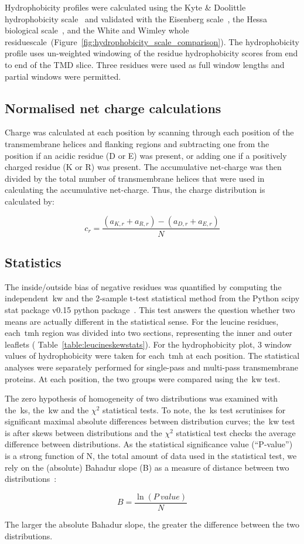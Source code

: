 Hydrophobicity profiles were calculated using the Kyte \& Doolittle hydrophobicity scale~\cite{Kyte1982} and validated with the Eisenberg scale~\cite{Eisenberg1984}, the Hessa biological scale~\cite{Hessa2005}, and the White and Wimley whole residuescale~\cite{White1999}(Figure~\ref{fig:hydrophobicity_scale_comparison}).
The hydrophobicity profile uses un-weighted windowing of the residue hydrophobicity scores from end to end of the TMD slice.
Three residues were used as full window lengths and partial windows were permitted.

\subsection{Normalised net charge calculations}

Charge was calculated at each position by scanning through each position of the transmembrane helices and flanking regions and subtracting one from the position if an acidic residue (D or E) was present, or adding one if a positively charged residue (K or R) was present.
The accumulative net-charge  was then divided by the total number  of transmembrane helices that were used in calculating the accumulative net-charge.
Thus, the charge distribution is calculated by:

\begin{equation} \label{eq:charge_equation}
c_r=\frac{(a_{K,r}+a_{R,r})-(a_{D,r}+a_{E,r})}{N}
\end{equation}

\subsection{Statistics}

The inside/outside bias of negative residues was quantified by computing the independent~\gls{kw} and the 2-sample t-test statistical method from the Python scipy stat package v0.15 python package~\cite{VanderWalt2011}.
This test answers the question whether two means are actually different in the statistical sense.
For the leucine residues, each~\gls{tmh} region was divided into two sections, representing the inner and outer leaflets ( Table~\ref{table:leucineskewstats}).
 For the hydrophobicity plot, 3 window values of hydrophobicity were taken for each~\gls{tmh} at each position.
The statistical analyses were separately performed for single-pass and multi-pass transmembrane proteins.
At each position, the two groups were compared using the~\gls{kw} test.

The zero hypothesis of homogeneity of two distributions was examined with the~\gls{ks}, the~\gls{kw} and the \({\chi}^{2}\) statistical tests.
To note, the~\gls{ks} test scrutinises for significant maximal absolute differences between distribution curves; the~\gls{kw} test is after skews between distributions and the \({\chi}^{2}\) statistical test checks the average difference between distributions.
As the statistical significance value (``P‑value'') is a strong function of N, the total amount of data used in the statistical test, we rely on the (absolute) Bahadur slope (B) as a measure of distance between two distributions~\cite{Bahadur1967, Bahadur1971}:

\begin{equation} \label{eq:bahadur}
B=\frac{\ln(P~value)}{N}
\end{equation}

The larger the absolute Bahadur slope, the greater the difference between the two distributions.
